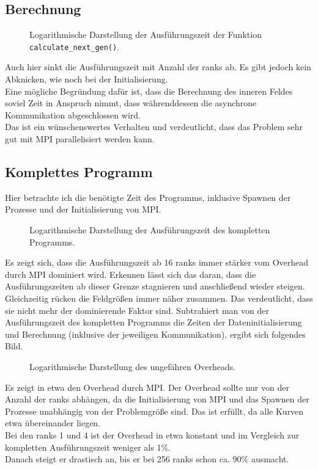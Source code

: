 \documentclass[german,plainarticle,hyperref,utf8]{zihpub}
\begin{document}
	\subsection{Berechnung}
	\begin{figure}[h]
		\centering
		
		\caption{Logarithmische Darstellung der Ausführungszeit der Funktion \texttt{calculate\_next\_gen()}.}
	\end{figure}
	Auch hier sinkt die Ausführungszeit mit Anzahl der ranks ab. Es gibt jedoch kein Abknicken, wie noch bei der Initialisierung.\\
	Eine mögliche Begründung dafür ist, dass die Berechnung des inneren Feldes soviel Zeit in Anspruch nimmt, dass währenddessen die asynchrone Kommunikation abgeschlossen wird.\\
	Das ist ein wünschenswertes Verhalten und verdeutlicht, dass das Problem sehr gut mit MPI parallelisiert werden kann.
	\clearpage
	\subsection{Komplettes Programm}
	Hier betrachte ich die benötigte Zeit des Programms, inklusive Spawnen der Prozesse und der Initialisierung von MPI.
	\begin{figure}[h]
		\centering
		
		\caption{Logarithmische Darstellung der Ausführungszeit des kompletten Programms.}
	\end{figure}

	Es zeigt sich, dass die Ausführungszeit ab 16 ranks immer stärker vom Overhead durch MPI dominiert wird. Erkennen lässt sich das daran, dass die Ausführungszeiten ab dieser Grenze stagnieren und anschließend wieder steigen. Gleichzeitig rücken die Feldgrößen immer näher zusammen. Das verdeutlicht, dass sie nicht mehr der dominierende Faktor sind.
	\clearpage
	Subtrahiert man von der Ausführungszeit des kompletten Programms die Zeiten der Dateninitialisierung und Berechnung (inklusive der jeweiligen Kommunikation), ergibt sich folgendes Bild.
	\begin{figure}[h]
		\centering
		
		\caption{Logarithmische Darstellung des ungefähren Overheads.}
	\end{figure}

	Es zeigt in etwa den Overhead durch MPI. Der Overhead sollte nur von der Anzahl der ranks abhängen, da die Initialisierung von MPI und das Spawnen der Prozesse unabhängig von der Problemgröße sind. Das ist erfüllt, da alle Kurven etwa übereinander liegen.\\
	Bei den ranks 1 und 4 ist der Overhead in etwa konstant und im Vergleich zur kompletten Ausführungszeit weniger als 1\%.\\
	Danach steigt er drastisch an, bis er bei 256 ranks schon ca. 90\% ausmacht.\\
	
\end{document}
